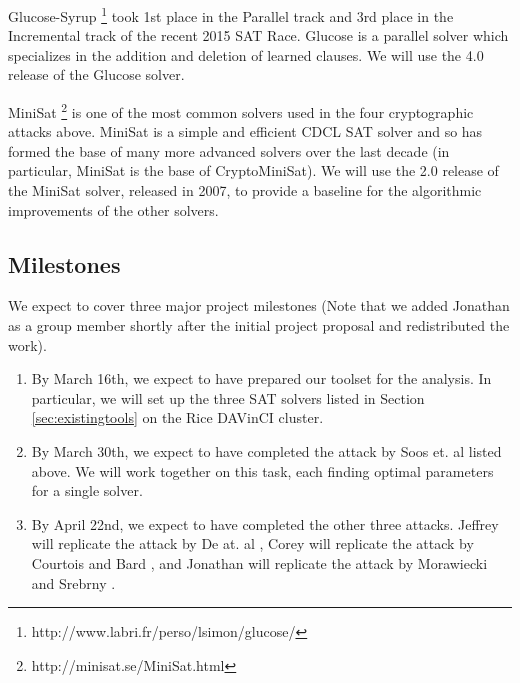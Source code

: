 Glucose-Syrup \footnote{http://www.labri.fr/perso/lsimon/glucose/} took 1st place in the Parallel track and 3rd place in the Incremental track of the recent 2015 SAT Race. Glucose is a parallel solver which specializes in the addition and deletion of learned clauses. We will use the 4.0 release of the Glucose solver.

MiniSat \footnote{http://minisat.se/MiniSat.html} is one of the most common solvers used in the four cryptographic attacks above. MiniSat is a simple and efficient CDCL SAT solver and so has formed the base of many more advanced solvers over the last decade (in particular, MiniSat is the base of CryptoMiniSat). We will use the 2.0 release of the MiniSat solver, released in 2007, to provide a baseline for the algorithmic improvements of the other solvers.

\subsection{Milestones}
We expect to cover three major project milestones (Note that we added Jonathan as a group member shortly after the initial project proposal and redistributed the work).
\begin{enumerate}
	\item By March 16th, we expect to have prepared our toolset for the analysis. In particular, we will set up the three SAT solvers listed in Section \ref{sec:existingtools} on the Rice DAVinCI cluster.
	
	\item By March 30th, we expect to have completed the attack by Soos et. al \cite{SNC09} listed above. We will work together on this task, each finding optimal parameters for a single solver.
	
	\item By April 22nd, we expect to have completed the other three attacks. Jeffrey will replicate the attack by De at. al \cite{DKV07}, Corey will replicate the attack by Courtois and Bard \cite{CB07}, and Jonathan will replicate the attack by Morawiecki and Srebrny \cite{MS13}.
\end{enumerate}